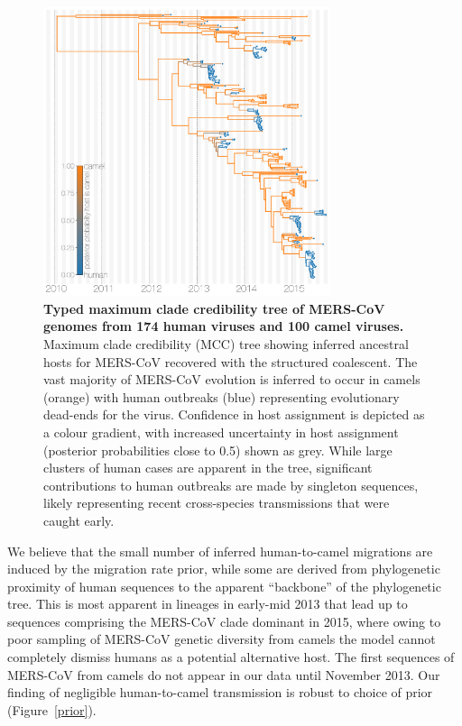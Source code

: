 \documentclass[9pt,lineno]{elife}
\begin{document}
\begin{figure}[h]
 \centering
	\includegraphics[width=0.75\textwidth]{figures/mers_mcc.png}
	\caption{\textbf{Typed maximum clade credibility tree of MERS-CoV genomes from 174 human viruses and 100 camel viruses.}
	Maximum clade credibility (MCC) tree showing inferred ancestral hosts for MERS-CoV recovered with the structured coalescent.
	The vast majority of MERS-CoV evolution is inferred to occur in camels (orange) with human outbreaks (blue) representing evolutionary dead-ends for the virus.
  Confidence in host assignment is depicted as a colour gradient, with increased uncertainty in host assignment (posterior probabilities close to 0.5) shown as grey.
	While large clusters of human cases are apparent in the tree, significant contributions to human outbreaks are made by singleton sequences, likely representing recent cross-species transmissions that were caught early.
	}
	\label{mcc}
\end{figure}

We believe that the small number of inferred human-to-camel migrations are induced by the migration rate prior, while some are derived from phylogenetic proximity of human sequences to the apparent ``backbone'' of the phylogenetic tree.
This is most apparent in lineages in early-mid 2013 that lead up to sequences comprising the MERS-CoV clade dominant in 2015, where owing to poor sampling of MERS-CoV genetic diversity from camels the model cannot completely dismiss humans as a potential alternative host.
The first sequences of MERS-CoV from camels do not appear in our data until November 2013.
Our finding of negligible human-to-camel transmission is robust to choice of prior (Figure~\ref{prior}).
\end{document}
